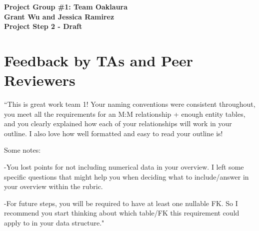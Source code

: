 \documentclass{article}
\begin{document}
\begin{center}
\large\textcolor{primarycolor}{\textbf{Project Group \#1: Team Oaklaura}}\\[0.3cm]
\large\textbf{Grant Wu and Jessica Ramirez}\\[0.3cm]
\huge\textbf{Project Step 2 - Draft}\\[1.25cm]
\end{center}
\section{Feedback by TAs and Peer Reviewers}

\begin{tcolorbox}[colback=secondarycolor, colframe=primarycolor, title=\textbf{TA Review - Madelyn Lazar}]
``This is great work team 1! Your naming conventions were consistent throughout, you meet all the requirements for an M:M relationship + enough entity tables, and you clearly explained how each of your relationships will work in your outline. I also love how well formatted and easy to read your outline is!

\vspace{0.2cm}

Some notes:

\vspace{0.2cm}

-You lost points for not including numerical data in your overview. I left some specific questions that might help you when deciding what to include/answer in your overview within the rubric.

\vspace{0.2cm}

-For future steps, you will be required to have at least one nullable FK. So I recommend you start thinking about which table/FK this requirement could apply to in your data structure."

\vspace{0.2cm}
\end{tcolorbox}

\vspace{0.5cm}
\end{document}
